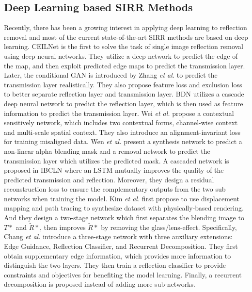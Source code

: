\documentclass[10pt,journal]{IEEEtran}
\begin{document}
\subsection{Deep Learning based SIRR Methods}\label{SIRR_Methods}
Recently, there has been a growing interest in applying deep learning to reflection removal and most of the current state-of-the-art SIRR methods \cite{fanGenericDeepArchitecture2017,zhangSingleImageReflection2018,yangSeeingDeeplyBidirectionally2018,weiSingleImageReflection2019,wenSingleImageReflection2019,liSingleImageReflection2020,kimSingleImageReflection2020,changSingleImageReflection2021} are based on deep learning. 
CEILNet \cite{fanGenericDeepArchitecture2017} is the first to solve the task of single image reflection removal using deep neural networks. 
They utilize a deep network to predict the edge of the map, and then exploit predicted edge maps to predict the transmission layer. 
Later, the conditional GAN \cite{isolaImagetoimageTranslationConditional2017} is introduced by Zhang \textit{et al.} \cite{zhangSingleImageReflection2018} to predict the transmission layer realistically. They also propose feature loss and exclusion loss to better separate reflection layer and transmission layer.
BDN \cite{yangSeeingDeeplyBidirectionally2018} utilizes a cascade deep neural network to predict the reflection layer, which is then used as feature information to predict the transmission layer. 
Wei \textit{et al.} \cite{weiSingleImageReflection2019} propose a contextual sensitively network, which includes two contextual forms, channel-wise context and multi-scale spatial context. They also introduce an alignment-invariant loss for training misaligned data. 
Wen \textit{et al.} \cite{wenSingleImageReflection2019} present a synthesis network to predict a non-linear alpha blending mask and a removal network to predict the transmission layer which utilizes the predicted mask.
A cascaded network is proposed in IBCLN \cite{liSingleImageReflection2020} where an LSTM mutually improves the quality of the predicted transmission and reflection. Moreover, they design a residual reconstruction loss to ensure the complementary outputs from the two sub networks when training the model. 
Kim \textit{et al.} \cite{kimSingleImageReflection2020} first propose to use displacement mapping and path tracing to synthesize dataset with physically-based rendering. And they design a two-stage network which first separates the blending image to $T*$ and $\tilde{R}*$, then improves $\tilde{R}*$ by removing the glass/lens-effect. 
Specifically, Chang \textit{et al.} \cite{changSingleImageReflection2021} introduce a three-stage network with three auxiliary extensions: Edge Guidance, Reflection Classifier, and Recurrent Decomposition. They first obtain supplementary edge information, which provides more information to distinguish the two layers. They then train a reflection classifier to provide constraints and objectives for benefiting the model learning. Finally, a recurrent decomposition is proposed instead of adding more sub-networks.
\end{document}
